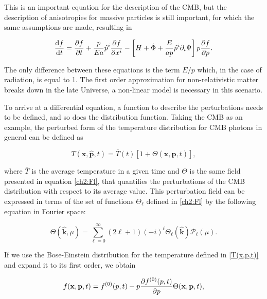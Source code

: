 \documentclass[openany,a4paper,12pt,oneside]{book}
\begin{document}
\begin{spacing}{1.5}
This is an important equation for the description of the CMB, but the description of anisotropies for massive particles is still important, for which the same assumptions are made, resulting in 

\begin{equation}\label{ch2:Boltzmann_matter_final}
    \dv{f}{t}=\pdv{f}{t}+\frac{p}{Ea}\hat{p}^i\pdv{f}{x^i}-\left[H+\dot{\Phi}+\frac{E}{ap}\hat{p}^i\partial_i\Psi\right]p\pdv{f}{p}.
\end{equation}

The only difference between these equations is the term $E/p$ which, in the case of radiation, is equal to 1. The first order approximation for non-relativistic matter breaks down in the late Universe, a non-linear model is necessary in this scenario. 

To arrive at a differential equation, a function to describe the perturbations needs to be defined, and so does the distribution function. Taking the CMB as an example, the perturbed form of the temperature distribution for CMB photons in general can be defined as

\begin{equation}\label{T(x,p,t)}
    T(\mathbf{x}, \hat{\mathbf{p}}, t)=\bar{T}(t)[1+\Theta(\mathbf{x}, \hat{\mathbf{p}}, t)],
\end{equation}

\noindent where $\bar{T}$ is the average temperature in a given time and $\Theta$ is the same field presented in equation \eqref{ch2:Fl}, that quantifies the perturbations of the CMB distribution with respect to its average value. This perturbation field can be expressed in terms of the set of functions $\Theta_\ell$ defined in \eqref{ch2:Fl} by the following equation in Fourier space:

\begin{equation}\label{Theta_&_Thetal}
    \Theta(\hat{\mathbf{k}}, \mu)=\sum_{\ell=0}^\infty (2\ell+1)(-i)^\ell \Theta_\ell(\hat{\mathbf{k}}) \mathcal{P}_\ell(\mu).
\end{equation}

If we use the Bose-Einstein distribution for the temperature defined in \eqref{T(x,p,t)} and expand it to its first order, we obtain 

\begin{equation}\label{f(x,p,t)_first_order}
    f(\mathbf{x}, \mathbf{p}, t)=f^{(0)}(p,t)-p\pdv{f^{(0)}(p,t)}{p}\Theta(\mathbf{x}, \mathbf{p}, t),
\end{equation}


\end{spacing}
\end{document}
